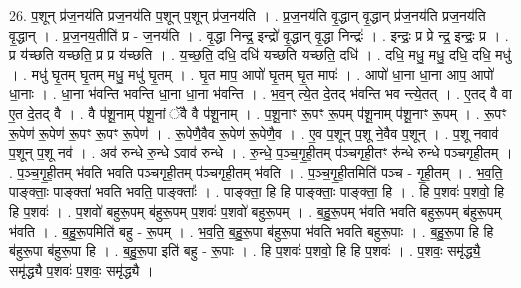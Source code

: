 \documentclass[17pt]{extarticle}
\begin{document}
26. प॒शून् प्र॑ज॒नय॑ति प्रज॒नय॑ति प॒शून् प॒शून् प्र॑ज॒नय॑ति । . प्र॒ज॒नय॑ति वृ॒द्धान् वृ॒द्धान् प्र॑ज॒नय॑ति प्रज॒नय॑ति वृ॒द्धान् । . प्र॒ज॒नय॒तीति॑ प्र - ज॒नय॑ति । . वृ॒द्धा निन्द्र॒ इन्द्रो॑ वृ॒द्धान् वृ॒द्धा निन्द्रः॑ । . इन्द्रः॒ प्र प्रे न्द्र॒ इन्द्रः॒ प्र । . प्र य॑च्छति यच्छति॒ प्र प्र य॑च्छति । . य॒च्छ॒ति॒ दधि॒ दधि॑ यच्छति यच्छति॒ दधि॑ । . दधि॒ मधु॒ मधु॒ दधि॒ दधि॒ मधु॑ । . मधु॑ घृ॒तम् घृ॒तम् मधु॒ मधु॑ घृ॒तम् । . घृ॒त माप॒ आपो॑ घृ॒तम् घृ॒त मापः॑ । . आपो॑ धा॒ना धा॒ना आप॒ आपो॑ धा॒नाः । . धा॒ना भ॑वन्ति भवन्ति धा॒ना धा॒ना भ॑वन्ति । . भ॒व॒न् त्ये॒त दे॒तद् भ॑वन्ति भव न्त्ये॒तत् । . ए॒तद् वै वा ए॒त दे॒तद् वै । . वै प॑शू॒नाम् प॑शू॒नां ॅवै वै प॑शू॒नाम् । . प॒शू॒नाꣳ रू॒पꣳ रू॒पम् प॑शू॒नाम् प॑शू॒नाꣳ रू॒पम् । . रू॒पꣳ रू॒पेण॑ रू॒पेण॑ रू॒पꣳ रू॒पꣳ रू॒पेण॑ । . रू॒पेणै॒वैव रू॒पेण॑ रू॒पेणै॒व । . ए॒व प॒शून् प॒शू ने॒वैव प॒शून् । . प॒शू नवाव॑ प॒शून् प॒शू नव॑ । . अव॑ रुन्धे रु॒न्धे ऽवाव॑ रुन्धे । . रु॒न्धे॒ प॒ञ्च॒गृ॒ही॒तम् प॑ञ्चगृही॒तꣳ रु॑न्धे रुन्धे पञ्चगृही॒तम् । . प॒ञ्च॒गृ॒ही॒तम् भ॑वति भवति पञ्चगृही॒तम् प॑ञ्चगृही॒तम् भ॑वति । . प॒ञ्च॒गृ॒ही॒तमिति॑ पञ्च - गृ॒ही॒तम् । . भ॒व॒ति॒ पाङ्क्ताः॒ पाङ्क्ता॑ भवति भवति॒ पाङ्क्ताः᳚ । . पाङ्क्ता॒ हि हि पाङ्क्ताः॒ पाङ्क्ता॒ हि । . हि प॒शवः॑ प॒शवो॒ हि हि प॒शवः॑ । . प॒शवो॑ बहुरू॒पम् ब॑हुरू॒पम् प॒शवः॑ प॒शवो॑ बहुरू॒पम् । . ब॒हु॒रू॒पम् भ॑वति भवति बहुरू॒पम् ब॑हुरू॒पम् भ॑वति । . ब॒हु॒रू॒पमिति॑ बहु - रू॒पम् । . भ॒व॒ति॒ ब॒हु॒रू॒पा ब॑हुरू॒पा भ॑वति भवति बहुरू॒पाः । . ब॒हु॒रू॒पा हि हि ब॑हुरू॒पा ब॑हुरू॒पा हि । . ब॒हु॒रू॒पा इति॑ बहु - रू॒पाः । . हि प॒शवः॑ प॒शवो॒ हि हि प॒शवः॑ । . प॒शवः॒ समृ॑द्ध्यै॒ समृ॑द्ध्यै प॒शवः॑ प॒शवः॒ समृ॑द्ध्यै । \newline
\end{document}
